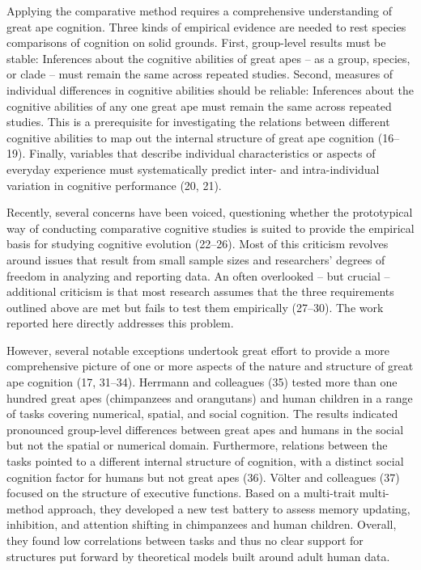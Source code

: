 \documentclass[
  man,floatsintext]{apa6}
\begin{document}
Applying the comparative method requires a comprehensive understanding of great ape cognition. Three kinds of empirical evidence are needed to rest species comparisons of cognition on solid grounds. First, group-level results must be stable: Inferences about the cognitive abilities of great apes -- as a group, species, or clade -- must remain the same across repeated studies. Second, measures of individual differences in cognitive abilities should be reliable: Inferences about the cognitive abilities of any one great ape must remain the same across repeated studies. This is a prerequisite for investigating the relations between different cognitive abilities to map out the internal structure of great ape cognition (16--19). Finally, variables that describe individual characteristics or aspects of everyday experience must systematically predict inter- and intra-individual variation in cognitive performance (20, 21).

Recently, several concerns have been voiced, questioning whether the prototypical way of conducting comparative cognitive studies is suited to provide the empirical basis for studying cognitive evolution (22--26). Most of this criticism revolves around issues that result from small sample sizes and researchers' degrees of freedom in analyzing and reporting data. An often overlooked -- but crucial -- additional criticism is that most research assumes that the three requirements outlined above are met but fails to test them empirically (27--30). The work reported here directly addresses this problem.

However, several notable exceptions undertook great effort to provide a more comprehensive picture of one or more aspects of the nature and structure of great ape cognition (17, 31--34). Herrmann and colleagues (35) tested more than one hundred great apes (chimpanzees and orangutans) and human children in a range of tasks covering numerical, spatial, and social cognition. The results indicated pronounced group-level differences between great apes and humans in the social but not the spatial or numerical domain. Furthermore, relations between the tasks pointed to a different internal structure of cognition, with a distinct social cognition factor for humans but not great apes (36). Völter and colleagues (37) focused on the structure of executive functions. Based on a multi-trait multi-method approach, they developed a new test battery to assess memory updating, inhibition, and attention shifting in chimpanzees and human children. Overall, they found low correlations between tasks and thus no clear support for structures put forward by theoretical models built around adult human data.
\end{document}
